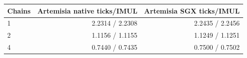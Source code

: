 \begin{tabular}{lrr}
\toprule
Chains & Artemisia native ticks/IMUL & Artemisia SGX ticks/IMUL \\
\midrule
1 & 2.2314 / 2.2308 & 2.2435 / 2.2456 \\
2 & 1.1156 / 1.1155 & 1.1249 / 1.1251 \\
4 & 0.7440 / 0.7435 & 0.7500 / 0.7502 \\
\bottomrule
\end{tabular}
